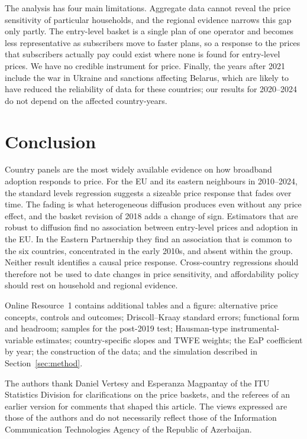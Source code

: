 \documentclass[pdflatex,sn-basic]{sn-jnl}
\newif\ifblind
\begin{document}
The analysis has four main limitations. Aggregate data cannot reveal the price sensitivity of particular households, and the regional evidence narrows this gap only partly. The entry-level basket is a single plan of one operator and becomes less representative as subscribers move to faster plans, so a response to the prices that subscribers actually pay could exist where none is found for entry-level prices. We have no credible instrument for price. Finally, the years after 2021 include the war in Ukraine and sanctions affecting Belarus, which are likely to have reduced the reliability of data for these countries; our results for 2020--2024 do not depend on the affected country-years.

\section{Conclusion}\label{sec:conclusion}

Country panels are the most widely available evidence on how broadband adoption responds to price. For the EU and its eastern neighbours in 2010--2024, the standard levels regression suggests a sizeable price response that fades over time. The fading is what heterogeneous diffusion produces even without any price effect, and the basket revision of 2018 adds a change of sign. Estimators that are robust to diffusion find no association between entry-level prices and adoption in the EU. In the Eastern Partnership they find an association that is common to the six countries, concentrated in the early 2010s, and absent within the group. Neither result identifies a causal price response. Cross-country regressions should therefore not be used to date changes in price sensitivity, and affordability policy should rest on household and regional evidence.

\backmatter

Online Resource~1 contains additional tables and a figure: alternative price concepts, controls and outcomes; Driscoll--Kraay standard errors; functional form and headroom; samples for the post-2019 test; Hausman-type instrumental-variable estimates; country-specific slopes and TWFE weights; the EaP coefficient by year; the construction of the data; and the simulation described in Section~\ref{sec:method}.

\ifblind\else
{}
The authors thank Daniel Vertesy and Esperanza Magpantay of the ITU Statistics Division for clarifications on the price baskets, and the referees of an earlier version for comments that shaped this article. The views expressed are those of the authors and do not necessarily reflect those of the Information Communication Technologies Agency of the Republic of Azerbaijan.
\fi
\end{document}
